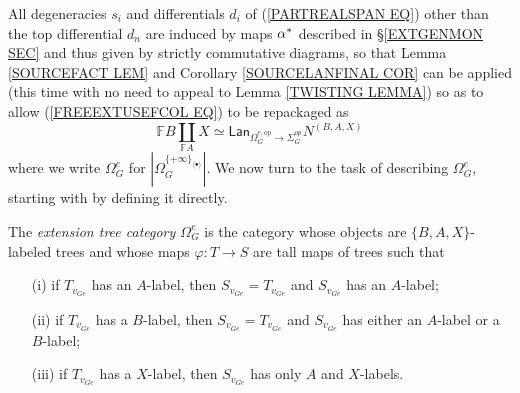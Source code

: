 \documentclass[a4paper,10pt]{article}%
\begin{document}
All degeneracies $s_i$ and differentials $d_i$ of 
(\ref{PARTREALSPAN EQ}) other than the top differential $d_n$ are induced by maps $\alpha^{\**}$ described in \S \ref{EXTGENMON SEC} and thus given by strictly commutative diagrams, so that Lemma \ref{SOURCEFACT LEM} and Corollary \ref{SOURCELANFINAL COR} can be applied (this time with no need to appeal to Lemma \ref{TWISTING LEMMA}) so as to allow 
(\ref{FREEEXTUSEFCOL EQ}) to be repackaged as 
\begin{equation}\label{FREEEXTUSEFCOLNEW EQ}
  \mathbb{F} B \coprod_{\mathbb{F} A} X
  \simeq
  \mathsf{Lan}_{\Omega_G^{e,op} \to \Sigma_G^{op}} 
  N^{(B,A,X)}
\end{equation}
where we write $\Omega_G^e$ for 
$|\Omega_{G}^{\{+\infty\}_{\langle \bullet \rangle}}|$.
We now turn to the task of describing $\Omega_G^e$, starting with by defining it directly.

\begin{definition}\label{EXTTREECAT DEF}
  The \textit{extension tree category $\Omega_G^e$} is the category whose objects are $\{B,A,X\}$-labeled trees and whose maps $\varphi \colon T \to S$ are tall maps of trees such that
  \begin{itemize}
  \item[(i)] if $T_{v_{Ge}}$ has an $A$-label, then 
    $S_{v_{Ge}}=T_{v_{Ge}}$ and $S_{v_{Ge}}$ has an $A$-label;
  \item[(ii)] if $T_{v_{Ge}}$ has a $B$-label, then 
    $S_{v_{Ge}}=T_{v_{Ge}}$ and $S_{v_{Ge}}$ has either an $A$-label or a $B$-label;
  \item[(iii)] if $T_{v_{Ge}}$ has a $X$-label, then 
    $S_{v_{Ge}}$ has only $A$ and $X$-labels.
  \end{itemize}
\end{definition}
\end{document}
